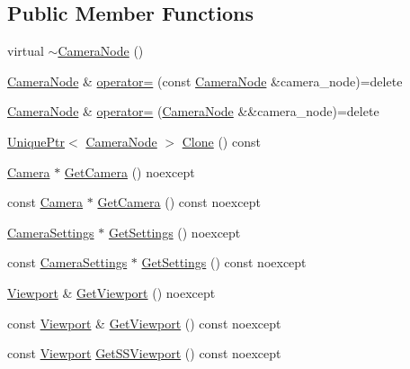 \subsection*{Public Member Functions}
\begin{DoxyCompactItemize}
\item 
virtual \hyperlink{classmage_1_1_camera_node_ac6612668e7b9f829e371794d422d357f}{$\sim$\+Camera\+Node} ()
\item 
\hyperlink{classmage_1_1_camera_node}{Camera\+Node} \& \hyperlink{classmage_1_1_camera_node_a03442d51e4279717f6692e0a731967a1}{operator=} (const \hyperlink{classmage_1_1_camera_node}{Camera\+Node} \&camera\+\_\+node)=delete
\item 
\hyperlink{classmage_1_1_camera_node}{Camera\+Node} \& \hyperlink{classmage_1_1_camera_node_a8da019549eeac6c4d7d6d7c4017dd498}{operator=} (\hyperlink{classmage_1_1_camera_node}{Camera\+Node} \&\&camera\+\_\+node)=delete
\item 
\hyperlink{namespacemage_a3316d7143a973e37adf1110f2e80ca31}{Unique\+Ptr}$<$ \hyperlink{classmage_1_1_camera_node}{Camera\+Node} $>$ \hyperlink{classmage_1_1_camera_node_a6c636830efadf9753f2f0d012153d61f}{Clone} () const
\item 
\hyperlink{classmage_1_1_camera}{Camera} $\ast$ \hyperlink{classmage_1_1_camera_node_aa9887e3bf192d6c078aae2430732cbf8}{Get\+Camera} () noexcept
\item 
const \hyperlink{classmage_1_1_camera}{Camera} $\ast$ \hyperlink{classmage_1_1_camera_node_aa911263cfce8cec2a42c6d03d25af606}{Get\+Camera} () const noexcept
\item 
\hyperlink{structmage_1_1_camera_settings}{Camera\+Settings} $\ast$ \hyperlink{classmage_1_1_camera_node_a0bd616c44db36301845b02a03f1db5ba}{Get\+Settings} () noexcept
\item 
const \hyperlink{structmage_1_1_camera_settings}{Camera\+Settings} $\ast$ \hyperlink{classmage_1_1_camera_node_a1098f7929715018978b1bb8ac00c7148}{Get\+Settings} () const noexcept
\item 
\hyperlink{classmage_1_1_viewport}{Viewport} \& \hyperlink{classmage_1_1_camera_node_ac280168901be6f8bdf03300f0b8c1a69}{Get\+Viewport} () noexcept
\item 
const \hyperlink{classmage_1_1_viewport}{Viewport} \& \hyperlink{classmage_1_1_camera_node_a09a761526f36b9547d29917835e907d6}{Get\+Viewport} () const noexcept
\item 
const \hyperlink{classmage_1_1_viewport}{Viewport} \hyperlink{classmage_1_1_camera_node_a1280c0c2735869d8703b67322f13b3cc}{Get\+S\+S\+Viewport} () const noexcept
\end{DoxyCompactItemize}
